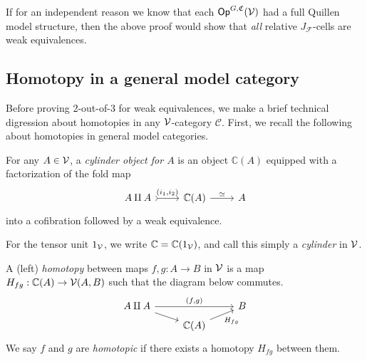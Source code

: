 \documentclass[a4paper,10pt
,draft
]{article}%
\renewcommand{\F}{\mathcal F}
\renewcommand{\1}{\eta}%
\begin{document}
\begin{remark}
      \label{OPGCV_F_JC_REM}
      If for an independent reason we know that each $\mathsf{Op}^{G, \mathfrak C}(\mathcal V)$ had a full Quillen model structure,
      then the above proof would show that \textit{all} relative $J_\F$-cells are weak equivalences.
\end{remark}





\subsection{Homotopy in a general model category}

Before proving 2-out-of-3 for weak equivalences, we make a brief technical digression about homotopies in any $\mathcal V$-category $\mathcal C$.
First, we recall the following about homotopies in general model categories.
\begin{definition}
      For any $A \in \mathcal V$, a \textit{cylinder object for $A$} is an object $\mathbb C(A)$ equipped with a factorization of the fold map
      \begin{equation}
            \begin{tikzcd}
                  A \amalg A \arrow[r, tail, "{(i_1,i_2)}"]
                  &
                  \mathbb C(A) \arrow[r, "\simeq"]
                  &
                  A
            \end{tikzcd}
      \end{equation}
      into a cofibration followed by a weak equivalence.
      
      For the tensor unit $1_{\mathcal V}$, we write $\mathbb C = \mathbb C(1_{\mathcal V})$, and call this simply a \textit{cylinder} in $\mathcal V$.
      
      A (left) \textit{homotopy} between maps $f,g: A \to B$ in $\mathcal V$ is a map $H_{fg}: \mathbb C(A) \to \mathcal V(A,B)$ such that
      the diagram below commutes.
      \begin{equation}
            \begin{tikzcd}[row sep = tiny]
                  A \amalg A \arrow[rr, "{(f,g)}"] \arrow[dr]
                  &&
                  B
                  \\
                  &
                  \mathbb C(A) \arrow[ur, "H_{fg}"']
            \end{tikzcd}
      \end{equation}
      We say $f$ and $g$ are \textit{homotopic} if there exists a homotopy $H_{f g}$ between them.
\end{definition}
\end{document}
